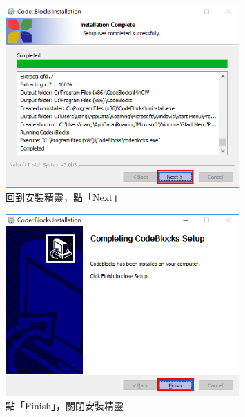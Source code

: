 		\begin{figure}[H]
			\centering
			\includegraphics[width=0.8\textwidth]{fig/install_and_setting/install_014_setup11}
			\caption{回到安裝精靈，點「Next」}
		\end{figure}
		
		\begin{figure}[H]
			\centering
			\includegraphics[width=0.8\textwidth]{fig/install_and_setting/install_015_setup12}
			\caption{點「Finish」，關閉安裝精靈}
		\end{figure}
	
